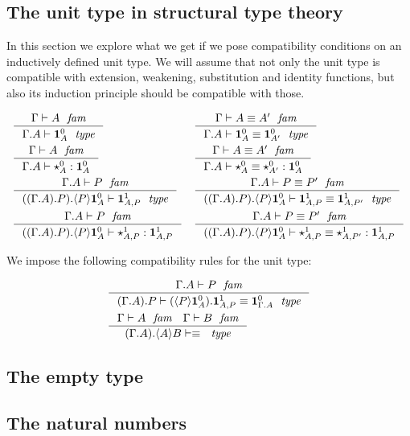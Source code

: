 \subsection{The unit type in structural type theory}
In this section we explore what we get if we pose compatibility conditions on
an inductively defined unit type. We will assume that not only the unit type
is compatible with extension, weakening, substitution and identity functions,
but also its induction principle should be compatible with those.

\begin{align*}
& \inference
  {\jfam{\Gamma}{A}}
  {\jtype{{\Gamma}{A}}{\unitc{A}}}
& & \inference
    {\jfameq{\Gamma}{A}{A'}}
    {\jtypeeq{{\Gamma}{A}}
      {\unitc{A}}
      {\unitc{A'}}}\\
& \inference
  {\jfam{\Gamma}{A}}
  {\jterm{{\Gamma}{A}}{\unitc{A}}{\unitct{A}}}
& & \inference
    {\jfameq{\Gamma}{A}{A'}}
    {\jtermeq{{\Gamma}{A}}{\unitc{A}}{\unitct{A}}{\unitct{A'}}}\\
& \inference
  {\jfam{{\Gamma}{A}}{P}}
  {\jtype{{{{\Gamma}{A}}{P}}{\ctxwk{P}{\unitc{A}}}}{\unitf{A}{P}}}
& & \inference
    {\jfameq{{\Gamma}{A}}{P}{P'}}
    {\jtypeeq{{{{\Gamma}{A}}{P}}{\ctxwk{P}{\unitc{A}}}}
      {\unitf{A}{P}}
      {\unitf{A}{P'}}}\\
& \inference
  {\jfam{{\Gamma}{A}}{P}}
  {\jterm{{{{\Gamma}{A}}{P}}{\ctxwk{P}{\unitc{A}}}}{\unitf{A}{P}}{\unitft{A}{P}}}
& & \inference
    {\jfameq{{\Gamma}{A}}{P}{P'}}
    {\jtermeq{{{{\Gamma}{A}}{P}}{\ctxwk{P}{\unitc{A}}}}{\unitf{A}{P}}
      {\unitft{A}{P}}
      {\unitft{A}{P'}}}
\end{align*}

We impose the following compatibility rules for the unit type:

\begin{align*}
& \inference
  {\jfam{{\Gamma}{A}}{P}}
  {\jtypeeq{{{\Gamma}{A}}{P}}{\ctxext{\ctxwk{P}{\unitc{A}}}{\unitf{A}{P}}}{\unitc{{\Gamma}{A}}}}\\
& \inference
  {\jfam{\Gamma}{A}
   \jfam{\Gamma}{B}}
  {\jtypeeq{{{\Gamma}{A}}{\ctxwk{A}{B}}}{}{}}  
\end{align*}

\subsection{The empty type}

\subsection{The natural numbers}

